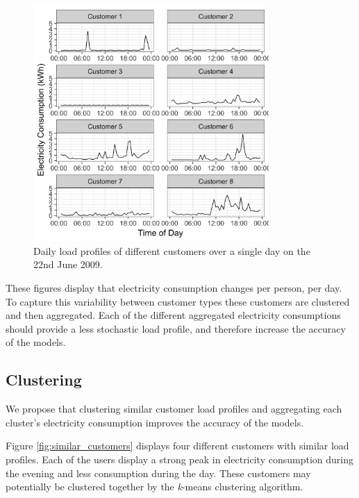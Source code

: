 \begin{figure}
	\includegraphics[width=0.8\textwidth]{Chapter5/figures/short-term-forecasting/Rplot02.png}
	\caption{Daily load profiles of different customers over a single day on the 22nd June 2009.}
	\label{fig:multiple_users}
\end{figure}

These figures display that electricity consumption changes per person, per day. To capture this variability between customer types these customers are clustered and then aggregated. Each of the different aggregated electricity consumptions should provide a less stochastic load profile, and therefore increase the accuracy of the models.

\subsection{Clustering}

We propose that clustering similar customer load profiles and aggregating each cluster's electricity consumption improves the accuracy of the models. 

Figure \ref{fig:similar_customers} displays four different customers with similar load profiles. Each of the users display a strong peak in electricity consumption during the evening and less consumption during the day. These customers may potentially be clustered together by the \textit{k}-means clustering algorithm.

